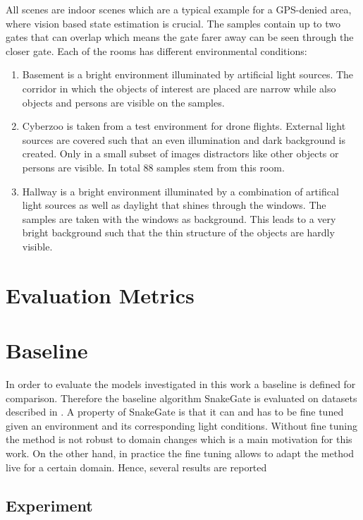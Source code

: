 All scenes are indoor scenes which are a typical example for a GPS-denied area, where vision based state estimation is crucial. The samples contain up to two gates that can overlap which means the gate farer away can be seen through the closer gate. Each of the rooms has different environmental conditions:
\begin{enumerate}
	\item Basement is a bright environment illuminated by artificial light sources. The corridor in which the objects of interest are placed are narrow while also objects and persons are visible on the samples.
	\item Cyberzoo is taken from a test environment for drone flights. External light sources are covered such that an even illumination and dark background is created. Only in a small subset of images distractors like other objects or persons are visible. In total 88 samples stem from this room.
	\item Hallway is a bright environment illuminated by a combination of artifical light sources as well as daylight that shines through the windows. The samples are taken with the windows as background. This leads to a very bright background such that the thin structure of the objects are hardly visible.
\end{enumerate}
 

\section{Evaluation Metrics}

\section{Baseline}


In order to evaluate the models investigated in this work a baseline is defined for comparison. Therefore the baseline algorithm SnakeGate is evaluated on datasets described in . A property of SnakeGate is that it can and has to be fine tuned given an environment and its corresponding light conditions. Without fine tuning the method is not robust to domain changes which is a main motivation for this work. On the other hand, in practice the fine tuning allows to adapt the method live for a certain domain. Hence, several results are reported

\subsection{Experiment}

